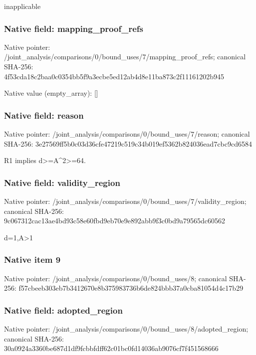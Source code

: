 \documentclass[10pt,a4paper]{article}
\begin{document}
\begingroup\raggedright\sloppy inapplicable\par\endgroup

\subsubsection{Native field: mapping\_\allowbreak{}proof\_\allowbreak{}refs}
Native pointer: /joint\_\allowbreak{}analysis/comparisons/0/bound\_\allowbreak{}uses/7/mapping\_\allowbreak{}proof\_\allowbreak{}refs; canonical SHA-256: 4f53cda18c2baa0c0354bb5f9a3ecbe5ed12ab4d8e11ba873c2f11161202b945

Native value (empty\_\allowbreak{}array): []

\subsubsection{Native field: reason}
Native pointer: /joint\_\allowbreak{}analysis/comparisons/0/bound\_\allowbreak{}uses/7/reason; canonical SHA-256: 3e27569ff5b0c03d36cfe47219c519c34b019ef5362b824036ead7cbc9cd6584

\begingroup\raggedright\sloppy R1 implies d>=\allowbreak{}A\textasciicircum{}2>=\allowbreak{}64.\par\endgroup

\subsubsection{Native field: validity\_\allowbreak{}region}
Native pointer: /joint\_\allowbreak{}analysis/comparisons/0/bound\_\allowbreak{}uses/7/validity\_\allowbreak{}region; canonical SHA-256: 9c067312cac13ae4bd93c58e60fbd9eb70e9e892abb9f3c0bd9a79565dc60562

\begingroup\raggedright\sloppy d=\allowbreak{}1,\allowbreak{}A>1\par\endgroup

\subsubsection{Native item 9}
Native pointer: /joint\_\allowbreak{}analysis/comparisons/0/bound\_\allowbreak{}uses/8; canonical SHA-256: f57cbeeb303eb7b3412670e8b375983736b6de824bbb37a0cba81054d4c17b29

\subsubsection{Native field: adopted\_\allowbreak{}region}
Native pointer: /joint\_\allowbreak{}analysis/comparisons/0/bound\_\allowbreak{}uses/8/adopted\_\allowbreak{}region; canonical SHA-256: 30a0924a3360be687d1df9fcbbfdff62c01bc0fd14036ab9076cf7f451568666
\end{document}
